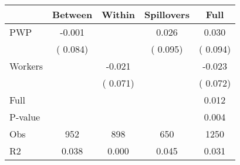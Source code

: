 
\begin{tabular}{l*{4}{c}}\hline&\multicolumn{1}{c}{Between}&\multicolumn{1}{c}{Within}&\multicolumn{1}{c}{Spillovers}&\multicolumn{1}{c}{Full}\\ \hline
 PWP           &             -0.001      &                                               &        0.026 &         0.030                            \\ 
                               &        (       0.084)           &                                       &       (       0.095)     &      (       0.094)                                           \\ 
 Workers       &                                               &       -0.021    &                                &            -0.023                            \\ 
                               &                                               & (       0.071)                  &                                        &      (       0.072)                                           \\ 
\hline                                                                                                                                                                                                                                            
 Full                  &                                               &                                               &                                        &             0.012                                     \\ 
 P-value               &                                               &                                               &                                        &             0.004                                           \\ 
 Obs                   &               952               &       898                       &       650                &              1250                                               \\ 
 R2                    &                      0.038              &              0.000                      &              0.045               &                     0.031                                              \\ 
\hline \end{tabular}                                                                                                                                                                                                              